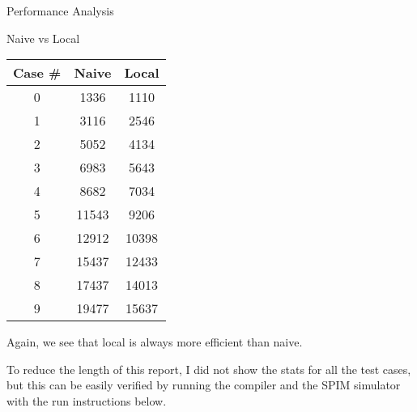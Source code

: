 \documentclass[letterpaper,12pt]{article}
\theoremstyle{definition}
\begin{document}
\begin{section}{Performance Analysis}
\begin{subsection}{Naive vs Local}
\begin{itemize}
\begin{table}[H]
\begin{minipage}{.4\textwidth}
\begin{tabular}{|c|c|c|}
                                Case \# & Naive & Local \\
                                \hline
                                0 & 1336 & 1110 \\
                                \hline
                                1 & 3116 & 2546 \\
                                \hline
                                2 & 5052 & 4134 \\
                                \hline
                                3 & 6983 & 5643 \\
                                \hline
                                4 & 8682 & 7034 \\
                                \hline
                                5 & 11543 & 9206 \\
                                \hline
                                6 & 12912 & 10398 \\
                                \hline
                                7 & 15437 & 12433 \\
                                \hline
                                8 & 17437 & 14013 \\
                                \hline
                                9 & 19477 & 15637 \\
                                \hline
                            \end{tabular}
                        \end{minipage}
                \end{table}
                Again, we see that local is always more efficient than naive.
            \end{itemize}

        To reduce the length of this report, I did not show the stats for all the test cases, but this can be easily verified by running the compiler and the SPIM simulator with the run instructions below.
        \end{subsection}
    \end{section}
\end{document}
